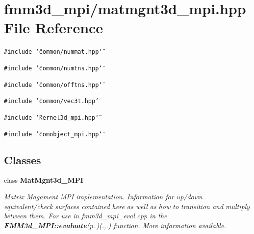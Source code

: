\section{fmm3d\_\-mpi/matmgnt3d\_\-mpi.hpp File Reference}
\label{matmgnt3d__mpi_8hpp}


{\tt \#include \char`\"{}common/nummat.hpp\char`\"{}}\par
{\tt \#include \char`\"{}common/numtns.hpp\char`\"{}}\par
{\tt \#include \char`\"{}common/offtns.hpp\char`\"{}}\par
{\tt \#include \char`\"{}common/vec3t.hpp\char`\"{}}\par
{\tt \#include \char`\"{}kernel3d\_\-mpi.hpp\char`\"{}}\par
{\tt \#include \char`\"{}comobject\_\-mpi.hpp\char`\"{}}\par
\subsection*{Classes}
\begin{CompactItemize}
\item 
class {\bf Mat\-Mgnt3d\_\-MPI}
\begin{CompactList}\small\item\em Matrix Magament MPI implementation. Information for up/down equivalent/check surfaces contained here as well as how to transition and multiply between them. For use in fmm3d\_\-mpi\_\-eval.cpp in the {\bf FMM3d\_\-MPI::evaluate}{\rm (p.\,\pageref{classFMM3d__MPI_8db45026f69e4b2b504f0c491c170d7d_8db45026f69e4b2b504f0c491c170d7d})}(.,.) function. More information available. \item\end{CompactList}\end{CompactItemize}

